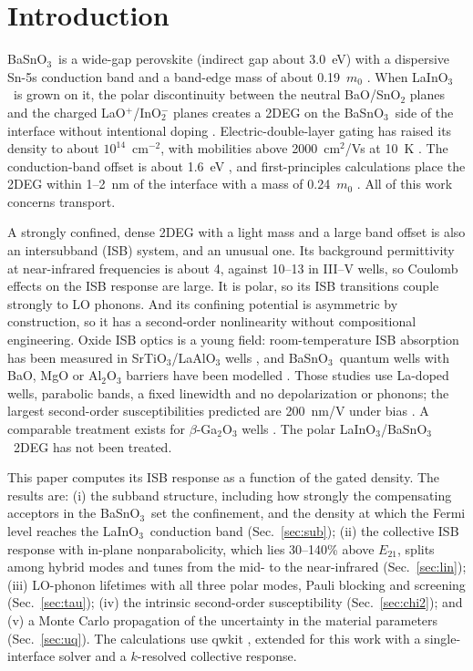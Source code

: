 \documentclass[11pt]{article}
\newcommand{\LIO}{LaInO$_3$}
\newcommand{\BSO}{BaSnO$_3$}
\begin{document}
\section{Introduction}
\BSO\ is a wide-gap perovskite (indirect gap about 3.0~eV) with a dispersive Sn-5s conduction band and a band-edge mass of about 0.19~$m_0$ \cite{Niedermeier2017,Aggoune2022}. When \LIO\ is grown on it, the polar discontinuity between the neutral BaO/SnO$_2$ planes and the charged LaO$^+$/InO$_2^-$ planes creates a 2DEG on the \BSO\ side of the interface without intentional doping \cite{Kim2019LIO,Aggoune2021}. Electric-double-layer gating has raised its density to about $10^{14}$~cm$^{-2}$, with mobilities above 2000~cm$^2$/Vs at 10~K \cite{Lee2024LIO}. The conduction-band offset is about 1.6~eV \cite{Kim2019LIO,Lee2024LIO}, and first-principles calculations place the 2DEG within 1--2~nm of the interface with a mass of 0.24~$m_0$ \cite{Aggoune2021}. All of this work concerns transport.

A strongly confined, dense 2DEG with a light mass and a large band offset is also an intersubband (ISB) system, and an unusual one. Its background permittivity at near-infrared frequencies is about 4, against 10--13 in III--V wells, so Coulomb effects on the ISB response are large. It is polar, so its ISB transitions couple strongly to LO phonons. And its confining potential is asymmetric by construction, so it has a second-order nonlinearity without compositional engineering. Oxide ISB optics is a young field: room-temperature ISB absorption has been measured in SrTiO$_3$/LaAlO$_3$ wells \cite{Ortmann2018}, and \BSO\ quantum wells with BaO, MgO or Al$_2$O$_3$ barriers have been modelled \cite{Li2021BSO,Stanojevic2023,Jang2023}. Those studies use La-doped wells, parabolic bands, a fixed linewidth and no depolarization or phonons; the largest second-order susceptibilities predicted are 200~nm/V under bias \cite{Li2021BSO}. A comparable treatment exists for $\beta$-Ga$_2$O$_3$ wells \cite{Lyman2020}. The polar \LIO/\BSO\ 2DEG has not been treated.

This paper computes its ISB response as a function of the gated density. The results are: (i) the subband structure, including how strongly the compensating acceptors in the \BSO\ set the confinement, and the density at which the Fermi level reaches the \LIO\ conduction band (Sec.~\ref{sec:sub}); (ii) the collective ISB response with in-plane nonparabolicity, which lies 30--140\% above $E_{21}$, splits among hybrid modes and tunes from the mid- to the near-infrared (Sec.~\ref{sec:lin}); (iii) LO-phonon lifetimes with all three polar modes, Pauli blocking and screening (Sec.~\ref{sec:tau}); (iv) the intrinsic second-order susceptibility (Sec.~\ref{sec:chi2}); and (v) a Monte Carlo propagation of the uncertainty in the material parameters (Sec.~\ref{sec:uq}). The calculations use qwkit \cite{qwkit}, extended for this work with a single-interface solver and a $k$-resolved collective response.
\end{document}
